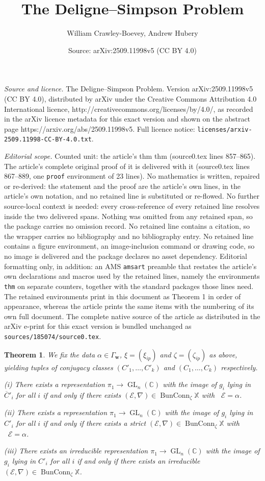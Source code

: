 \documentclass[10pt,a4paper]{amsart}
\title{The Deligne--Simpson Problem}
\author{William Crawley-Boevey, Andrew Hubery}
\date{Source: arXiv:2509.11998v5 (CC BY 4.0)}
\newtheorem{thm}{Theorem}
\DeclareMathOperator{\BunConn}{BunConn}
\newcommand{\C}{\mathbb C}
\newcommand{\E}{\mathcal E}
\DeclareMathOperator{\GL}{GL}
\newcommand{\XX}{\mathbb X}
\newcommand{\bw}{\mathbf w}
\DeclareMathOperator{\dimv}{\underline\dim}
\begin{document}
\maketitle

\noindent\emph{Source and licence.} The Deligne--Simpson Problem. Version arXiv:2509.11998v5 (CC BY 4.0), distributed by arXiv under the Creative Commons Attribution 4.0 International licence, http://creativecommons.org/licenses/by/4.0/, as recorded in the arXiv licence metadata for this exact version and shown on the abstract page https://arxiv.org/abs/2509.11998v5. Full licence notice: \texttt{licenses/arxiv-2509.11998-CC-BY-4.0.txt}.\par\smallskip

\noindent\textit{Editorial scope.} Counted unit: the article's thm thm (source0.tex lines 857--865). The article's complete original proof of it is delivered with it (source0.tex lines 867--889, one \texttt{proof} environment of 23 lines). No mathematics is written, repaired or re-derived: the statement and the proof are the article's own lines, in the article's own notation, and no retained line is substituted or re-flowed.  No further source-local context is needed: every cross-reference of every retained line resolves inside the two delivered spans.  Nothing was omitted from any retained span, so the package carries no omission record.  No retained line contains a citation, so the wrapper carries no bibliography and no bibliography entry.  No retained line contains a figure environment, an image-inclusion command or drawing code, so no image is delivered and the package declares no asset dependency.  Editorial formatting only, in addition: an AMS \texttt{amsart} preamble that restates the article's own declarations and macros used by the retained lines, namely the environments \texttt{thm} on separate counters, together with the standard packages those lines need.  The retained environments print in this document as Theorem 1 in order of appearance, whereas the article prints the same items with the numbering of its own full document.  The complete native source of the article as distributed in the arXiv e-print for this exact version is bundled unchanged as \texttt{sources/185074/source0.tex}.
\begin{thm}
We fix the data $\alpha\in\Gamma_\bw$, $\xi=(\xi_{ip})$ and $\zeta=(\zeta_{ip})$ as above, yielding tuples of conjugacy classes $(C'_1,\ldots,C'_k)$ and $(C_1,\ldots,C_k)$ respectively.

(i) There exists a representation $\pi_1\to\GL_n(\C)$ with the image of $g_i$ lying in $\overline C'_i$ for all $i$ if and only if there exists $(\E,\nabla)\in\BunConn_\zeta\XX$ with $\dimv\E=\alpha$.

(ii) There exists a representation $\pi_1\to\GL_n(\C)$ with the image of $g_i$ lying in $C'_i$ for all $i$ if and only if there exists a strict $(\E,\nabla)\in\BunConn_\zeta\XX$ with $\dimv\E=\alpha$.

(iii) There exists an irreducible representation $\pi_1\to\GL_n(\C)$ with the image of $g_i$ lying in $C'_i$ for all $i$ if and only if there exists an irreducible $(\E,\nabla)\in\BunConn_\zeta\XX$.
\end{thm}
\end{document}
